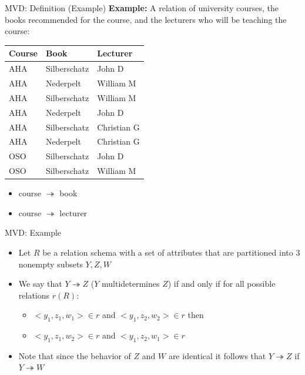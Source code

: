 \documentclass[aspectratio=169, xcolor=dvipsnames]{beamer}
\begin{document}
\begin{frame}{MVD: Definition (Example)}
    \textbf{Example:} A relation of university courses, the books recommended for the course, and the lecturers who will be teaching the course:
    \begin{table}
    \centering
    \begin{tabular}{lll}
    \toprule
    \textbf{Course} & \textbf{Book} & \textbf{Lecturer} \\
    \midrule
    AHA & Silberschatz & John D \\
    AHA & Nederpelt & William M \\
    AHA & Silberschatz & William M \\
    AHA & Nederpelt & John D \\
    AHA & Silberschatz & Christian G \\
    AHA & Nederpelt & Christian G \\
    OSO & Silberschatz & John D \\
    OSO & Silberschatz & William M \\
    \bottomrule
    \end{tabular}
    \end{table}
    \begin{itemize}
        \item course $\twoheadrightarrow$ book
        \item course $\twoheadrightarrow$ lecturer
    \end{itemize}
\end{frame}

\begin{frame}{MVD: Example}
    \begin{itemize}[<+->]
        \item Let $R$ be a relation schema with a set of attributes that are partitioned into 3 nonempty subsets $Y, Z, W$
        \item We say that $Y \twoheadrightarrow Z$ ($Y$ multidetermines $Z$) if and only if for all possible relations $r(R)$:
        \begin{itemize}
            \item[$\triangleright$] $< y_1, z_1, w_1 > \in r$ and $< y_1, z_2, w_2 > \in r$ then
            \item[$\triangleright$] $< y_1, z_1, w_2 > \in r$ and $< y_1, z_2, w_1 > \in r$
        \end{itemize}
        \item Note that since the behavior of $Z$ and $W$ are identical it follows that $Y \twoheadrightarrow Z$ if $Y \twoheadrightarrow W$
    \end{itemize}
\end{frame}
\end{document}

